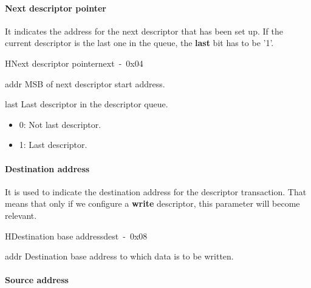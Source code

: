 \newpage
\paragraph{Next descriptor pointer} %
It indicates the address for the next descriptor that has been set up. If the current descriptor is the last one in the queue, the \textbf{last} bit has to be '1'.\\

\begin{register}{H}{Next descriptor pointer}{next~-~0x04}
    \label{desc_next}%
    \regnewline%
    \begin{regdesc}\begin{reglist}
        \item [addr]MSB of next descriptor start address.
        \item [last]Last descriptor in the descriptor queue.
		\begin{itemize}
  		\item 0: Not last descriptor.
  		\item 1: Last descriptor.
		\end{itemize}
 \end{reglist}\end{regdesc}\end{register}


\paragraph{Destination address} %
It is used to indicate the destination address for the descriptor transaction. That means that only if we configure a \textbf{write} descriptor, this parameter will become relevant.\\

\begin{register}{H}{Destination base address}{dest~-~0x08}
    \label{desc_dst}%
    \regnewline%
    \begin{regdesc}\begin{reglist}
        \item [addr]Destination base address to which data is to be written.
 \end{reglist}\end{regdesc}\end{register}

\paragraph{Source address} %

